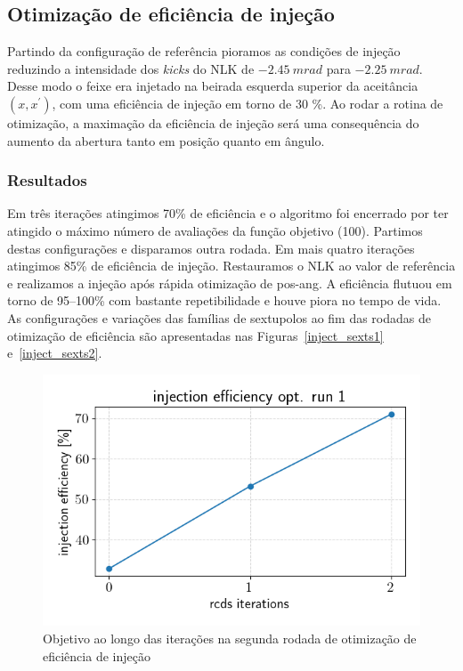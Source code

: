 \documentclass[a4paper,
               keeplastbox,   %
               ]{jacow}
\begin{document}
\subsection{Otimização de eficiência de injeção}
Partindo da configuração de referência pioramos as condições de injeção reduzindo a intensidade dos \textit{kicks} do NLK de $-2.45~\unit{m rad}$ para $-2.25~\unit{m rad}$. Desse modo o feixe era injetado na beirada esquerda superior da aceitância $(x,x^\prime)$, com uma eficiência de injeção em torno de 30 \%. Ao rodar a rotina de otimização, a maximação da eficiência de injeção será uma consequência do aumento da abertura tanto em posição quanto em ângulo. 
\subsubsection{Resultados}
Em três iterações atingimos 70\% de eficiência e o algoritmo foi encerrado por ter atingido o máximo número de avaliações da função objetivo (100). Partimos destas configurações e disparamos outra rodada. Em mais quatro iterações atingimos 85\% de eficiência de injeção. Restauramos o NLK ao valor de referência e realizamos a injeção após rápida otimização de pos-ang. A eficiência flutuou em torno de 95--100\% com bastante repetibilidade e houve piora no tempo de vida. 
As configurações e variações das famílias de sextupolos ao fim das rodadas de otimização de eficiência são apresentadas nas Figuras~\ref{inject_sexts1} e~\ref{inject_sexts2}.
\begin{figure}
    \centering
    \includegraphics[width=\columnwidth]{injeff_hist_run1.png}
    \caption{Objetivo ao longo das iterações na segunda rodada de otimização de eficiência de injeção}
    \label{injeff_hist1}
\end{figure}
\end{document}
